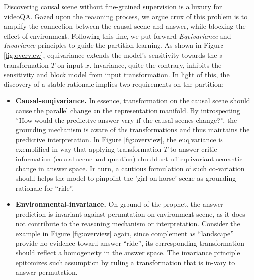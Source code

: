 
Discovering causal scene without fine-grained supervision is a luxury for videoQA. Gazed upon the reasoning process, we argue crux of this problem is to amplify the connection between the causal scene and answer, while blocking the effect of environment. Following this line, we put forward \textit{Equivariance} and \textit{Invariance} principles to guide the partition learning.
As shown in Figure \ref{fig:overview}, equivariance extends the model's sensitivity towards the a transformation $T$ on input $x$. Invariance, quite the contrary, inhibits the sensitivity and block model from input transformation. In light of this, the discovery of a stable rationale implies two requirements on the partition:
%
\begin{itemize}[leftmargin=*]
    \item \textbf{Causal-euqivariance.} In essence, transformation on the causal scene should cause the parallel change on the representation manifold. By introspecting ``How would the predictive answer vary if the causal scenes change?'', the grounding mechanism is aware of the transformations and thus maintains the predictive interpretation.
    In Figure \ref{fig:overview}, the euqivariance is exemplified in way that applying transformation $T$ to answer-critic information (\ie causal scene and question) should set off equivariant semantic change in answer space.
    In turn, a cautious formulation of such co-variation should helps the model to pinpoint the 'girl-on-horse' scene as grounding rationale for ``ride''.
    
    \item \textbf{Environmental-invariance.} On ground of the prophet, the answer prediction is invariant against permutation on environment scene, as it does not contribute to the reasoning mechanism or interpretation. 
    Consider the example in Figure \ref{fig:overview} again, since complement as ``landscape'' provide no evidence toward answer ``ride'', its corresponding transformation should reflect a homogeneity in the answer space. The invariance principle epitomizes such assumption by ruling a transformation that is in-vary to answer permutation.
\end{itemize}



